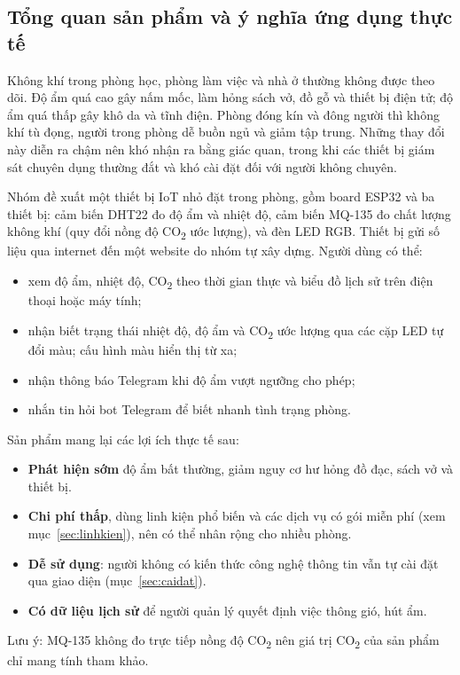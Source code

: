 \documentclass[12pt,a4paper]{article}
\begin{document}
\subsection{Tổng quan sản phẩm và ý nghĩa ứng dụng thực tế}
Không khí trong phòng học, phòng làm việc và nhà ở thường không được theo dõi. Độ ẩm quá cao gây nấm mốc, làm hỏng sách vở, đồ gỗ và thiết bị điện tử; độ ẩm quá thấp gây khô da và tĩnh điện. Phòng đóng kín và đông người thì không khí tù đọng, người trong phòng dễ buồn ngủ và giảm tập trung. Những thay đổi này diễn ra chậm nên khó nhận ra bằng giác quan, trong khi các thiết bị giám sát chuyên dụng thường đắt và khó cài đặt đối với người không chuyên.

Nhóm đề xuất một thiết bị IoT nhỏ đặt trong phòng, gồm board ESP32 và ba thiết bị: cảm biến DHT22 đo độ ẩm và nhiệt độ, cảm biến MQ-135 đo chất lượng không khí (quy đổi nồng độ CO\textsubscript{2} ước lượng), và đèn LED RGB. Thiết bị gửi số liệu qua internet đến một website do nhóm tự xây dựng. Người dùng có thể:
\begin{itemize}
  \item xem độ ẩm, nhiệt độ, CO\textsubscript{2} theo thời gian thực và biểu đồ lịch sử trên điện thoại hoặc máy tính;
  \item nhận biết trạng thái nhiệt độ, độ ẩm và CO\textsubscript{2} ước lượng qua các cặp LED tự đổi màu; cấu hình màu hiển thị từ xa;
  \item nhận thông báo Telegram khi độ ẩm vượt ngưỡng cho phép;
  \item nhắn tin hỏi bot Telegram để biết nhanh tình trạng phòng.
\end{itemize}

Sản phẩm mang lại các lợi ích thực tế sau:
\begin{itemize}
  \item \textbf{Phát hiện sớm} độ ẩm bất thường, giảm nguy cơ hư hỏng đồ đạc, sách vở và thiết bị.
  \item \textbf{Chi phí thấp}, dùng linh kiện phổ biến và các dịch vụ có gói miễn phí (xem mục~\ref{sec:linhkien}), nên có thể nhân rộng cho nhiều phòng.
  \item \textbf{Dễ sử dụng}: người không có kiến thức công nghệ thông tin vẫn tự cài đặt qua giao diện (mục~\ref{sec:caidat}).
  \item \textbf{Có dữ liệu lịch sử} để người quản lý quyết định việc thông gió, hút ẩm.
\end{itemize}
Lưu ý: MQ-135 không đo trực tiếp nồng độ CO\textsubscript{2} nên giá trị CO\textsubscript{2} của sản phẩm chỉ mang tính tham khảo.
\end{document}
